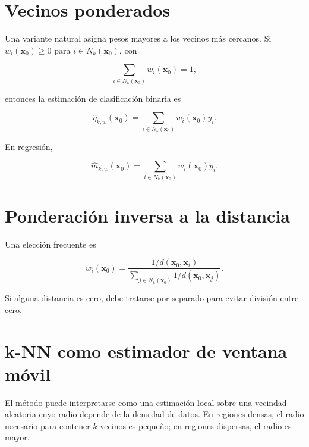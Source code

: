 \documentclass[
  spanish,
  10.5pt,
  letterpaper,
  DIV=11,
  numbers=noendperiod,
  oneside,
  open=any]{scrreprt}
\theoremstyle{definition}
\theoremstyle{definition}
\theoremstyle{plain}
\theoremstyle{remark}
\begin{document}
\section*{Vecinos ponderados}\label{vecinos-ponderados}


Una variante natural asigna pesos mayores a los vecinos más cercanos. Si
\(w_i(\mathbf{x}_0)\ge 0\) para \(i\in N_k(\mathbf{x}_0)\), con

\[
\sum_{i\in N_k(\mathbf{x}_0)} w_i(\mathbf{x}_0)=1,
\]

entonces la estimación de clasificación binaria es

\[
\widehat{\eta}_{k,w}(\mathbf{x}_0)
=
\sum_{i\in N_k(\mathbf{x}_0)}
w_i(\mathbf{x}_0)
y_i.
\]

En regresión,

\[
\widehat{m}_{k,w}(\mathbf{x}_0)
=
\sum_{i\in N_k(\mathbf{x}_0)}
w_i(\mathbf{x}_0)
y_i.
\]

\section*{Ponderación inversa a la
distancia}\label{ponderaciuxf3n-inversa-a-la-distancia}


Una elección frecuente es

\[
w_i(\mathbf{x}_0)
=
\frac{1/d(\mathbf{x}_0,\mathbf{x}_i)}
{\sum_{j\in N_k(\mathbf{x}_0)}1/d(\mathbf{x}_0,\mathbf{x}_j)}.
\]

Si alguna distancia es cero, debe tratarse por separado para evitar
división entre cero.

\section*{k-NN como estimador de ventana
móvil}\label{k-nn-como-estimador-de-ventana-muxf3vil}


El método puede interpretarse como una estimación local sobre una
vecindad aleatoria cuyo radio depende de la densidad de datos. En
regiones densas, el radio necesario para contener \(k\) vecinos es
pequeño; en regiones dispersas, el radio es mayor.
\end{document}
